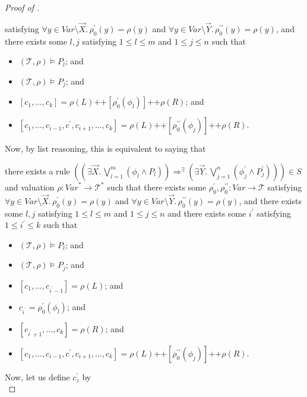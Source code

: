 \documentclass{article}
\newenvironment{proofenv}
  {
    \VerbatimEnvironment\begin{tcolorbox}[colback=black!0!white] %
  }
  {
   \end{tcolorbox}
  }
\begin{document}
\begin{proof}[Proof of ]
\begin{proofenv}
satisfying $\forall y \in \mathit{Var} \setminus \vec{X}.\, \rho_0^\prime(y) = \rho(y)$
and $\forall y \in \mathit{Var} \setminus \vec{Y}.\, \rho_0^{\prime\prime}(y) = \rho(y)$,
and there exists some $l,j$ satisfying $1 \leq l \leq m$ and $1 \leq j \leq n$ such that
\begin{itemize}
    \item $(\mathcal{T}, \rho) \vDash P_l$; and
    \item $(\mathcal{T}, \rho) \vDash P_j$; and
    \item $[c_1,\ldots,c_k] = \rho(L) \texttt{++} [\rho_0^\prime(\phi_l)] \texttt{++} \rho(R)$; and
    \item $[c_1, \ldots, c_{i-1}, c^\prime, c_{i+1}, \ldots, c_k] = \rho(L)
    \texttt{++} [\rho_0^{\prime\prime}(\phi_j)] 
    \texttt{++} \rho(R)$.
\end{itemize}
\end{proofenv}
Now, by list reasoning, this is equivalent to
saying that
\begin{proofenv}
there exists a rule $((\exists \vec{X}.\, \bigvee_{l=1}^{m} (\phi_l \land P_l)) \Rightarrow^\exists (\exists \vec{Y}.\, \bigvee_{j=1}^{n} (\phi^\prime_j \land P^\prime_j))) \in S$
and valuation $\rho : \mathit{Var}^* \to \mathcal{T}^*$ such that
there exists some $\rho_0^\prime,\rho_0^{\prime\prime} : \mathit{Var} \to \mathcal{T}$
satisfying $\forall y \in \mathit{Var} \setminus \vec{X}.\, \rho_0^\prime(y) = \rho(y)$
and $\forall y \in \mathit{Var} \setminus \vec{Y}.\, \rho_0^{\prime\prime}(y) = \rho(y)$,
and there exists some $l,j$ satisfying $1 \leq l \leq m$ and $1 \leq j \leq n$
and there exists some $i^\prime$ satisfying $1 \leq i^\prime \leq k$
such that
\begin{itemize}
    \item $(\mathcal{T}, \rho) \vDash P_l$; and
    \item $(\mathcal{T}, \rho) \vDash P_j$; and
    \item $[c_1,\ldots, c_{i^\prime-1}] = \rho(L)$; and
    \item $c_{i^\prime} = \rho_0^\prime(\phi_l)$; and
    \item $[c_{i^\prime+1},\ldots,c_k] = \rho(R)$; and
    \item $[c_1, \ldots, c_{i-1}, c^\prime, c_{i+1}, \ldots, c_k] = \rho(L)
    \texttt{++} [\rho_0^{\prime\prime}(\phi_j)] 
    \texttt{++} \rho(R)$.
\end{itemize}
\end{proofenv}
Now, let us define $c^\prime_{z}$ by
\begin{equation*}

\end{equation*}
\end{proof}
\end{document}
